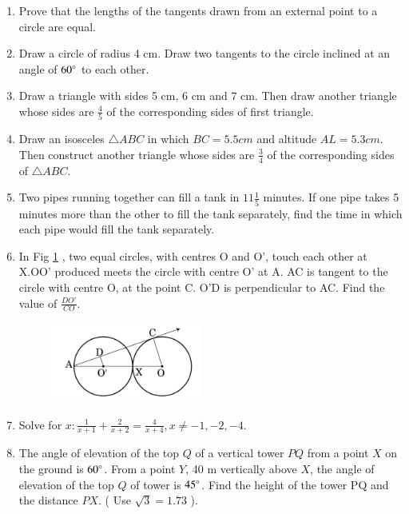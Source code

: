 \documentclass[book,11pt,onecolumn]{IEEEtran}
\begin{document}
\begin{enumerate}
\item Prove that the lengths of the tangents drawn from an external point to a circle are equal.\\
\item Draw a circle of radius 4 cm. Draw two tangents to the circle inclined at an angle of $ 60 \degree $ to each other.\\
\item Draw a triangle with sides 5 cm, 6 cm and 7 cm. Then draw another triangle whose sides are $\frac{4}{5}$ of the corresponding sides of first triangle.\\
\item Draw an isosceles $\triangle ABC$ in which $BC=5.5 cm$ and altitude $AL=5.3 cm$. Then construct another triangle whose sides are $\frac{3}{4}$ of the corresponding sides of $\triangle ABC$.\\
\item Two pipes running together can fill a tank in $11\frac{1}{5}$ minutes. If one pipe takes 5 minutes more than the other to fill the tank separately, find the time in which each pipe would fill the tank separately.\\
\item In Fig \ref{figure_7} , two equal circles, with centres O and O', touch each other at X.OO' produced meets the circle with centre O' at A. AC is tangent to the circle with centre O, at the point C. O'D is perpendicular to AC. Find the value of $\frac{DO'}{CO}$.\\
	\begin{figure}[H]
      \centering
      \includegraphics[width=5cm]{figs/7.png}
      \caption{}
      \label{figure_7}
   \end{figure} 
 
\item  Solve for $ x :  \frac{1}{x+1}  + \frac{2}{x+2}  = \frac{4}{x+4} , x \neq -1,-2,-4 .$ \\

\item The angle of elevation of the top $Q$ of a vertical tower $PQ$ from a point $X$ on the ground is $ 60\degree $. From a point $Y$, 40 m vertically above $X$, the angle of elevation of the top $Q$ of tower is $ 45 \degree $. Find the height of the tower PQ and the distance $PX$. ( Use $ \sqrt{3} = 1.73 $ ).\\
 

\end{enumerate}
\end{document}
